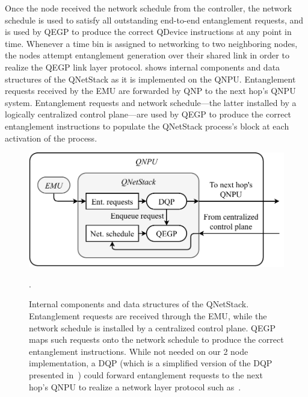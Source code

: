 Once the node received the network schedule from the controller, the network schedule is used to satisfy all outstanding end-to-end entanglement requests, and is used by \ac{QEGP} to produce the correct \ac{QDevice} instructions at any point in time. Whenever a time bin is assigned to networking to two neighboring nodes, the nodes attempt entanglement generation over their shared link in order to realize the \ac{QEGP} link layer protocol. 
 shows internal components and data structures of the \ac{QNetStack} as it is implemented on the \ac{QNPU}. Entanglement requests received by the \ac{EMU} are forwarded by \ac{QNP} to the next hop's \ac{QNPU} system. Entanglement requests and network schedule---the latter installed by a logically centralized control plane---are used by \ac{QEGP} to produce the correct entanglement instructions to populate the \ac{QNetStack} process's block at each activation of the process.

\begin{figure}
\begin{center}
\includegraphics[width=\linewidth]{figures/qnodeos/supplementary/qnetstack-impl.pdf}
\end{center}
\caption[]{Internal components and data structures of the \acf{QNetStack}. Entanglement requests are received through the \acf{EMU}, while the network schedule is installed by a centralized control plane. 
\acf{QEGP} maps such requests onto the network schedule to produce the correct entanglement instructions. While not needed on our 2 node implementation, a \ac{DQP} (which is a simplified version of the \ac{DQP} presented in~\cite[Section 5.2.1]{dahlberg_2019_egp}) could forward entanglement requests to the next hop's \acf{QNPU} to realize a network layer protocol such as~\cite{kozlowski_2020_qnp}.}.
\label{fig:qnetstack-impl}
\end{figure}

